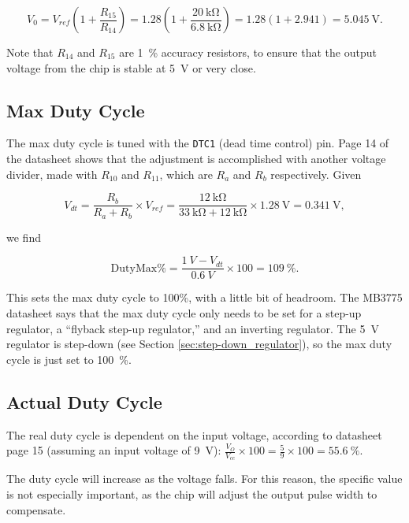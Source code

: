 \documentclass{article}
\newcommand{\chippin}{\texttt}
\newcommand{\model}{\textsf}
\begin{document}
\begin{displaymath}
  V_0 = V_{ref}(1+\frac{R_{15}}{R_{14}}) =
  1.28(1+\frac{\qty{20}{\kilo\ohm}}{\qty{6.8}{\kilo\ohm}})
  = 1.28(1+2.941) = \qty{5.045}{\volt}.
\end{displaymath}

Note that $R_{14}$ and $R_{15}$ are \qty{1}{\%} accuracy resistors, to
ensure that the output voltage from the chip is stable at
\qty{5}{\volt} or very close.


\subsection{Max Duty Cycle}
The max duty cycle is tuned with the \chippin{DTC1} (dead time
control) pin. Page 14 of the datasheet shows that the adjustment is
accomplished with another voltage divider, made with $R_{10}$ and
$R_{11}$, which are $R_a$ and $R_b$ respectively. Given

\begin{displaymath}
  V_{dt} = \frac{R_b}{R_a+R_b} \times{} V_{ref} =
  \frac{\qty{12}{\kilo\ohm}}{\qty{33}{\kilo\ohm} + \qty{12}{\kilo\ohm}} \times{}
  \qty{1.28}{\volt} = \qty{0.341}{\volt},
\end{displaymath}

\noindent
we find

\begin{displaymath}
  \mathrm{Duty Max \%} = \frac{\qty{1}{V} - V_{dt}}{\qty{0.6}{V}}
  \times{} 100 = \qty{109}{\%}.
\end{displaymath}

This sets the max duty cycle to 100\%, with a little bit of
headroom. The \model{MB3775} datasheet says that the max duty cycle
only needs to be set for a step-up regulator, a ``flyback step-up
regulator,'' and an inverting regulator. The \qty{5}{\volt} regulator
is step-down (see Section \ref{sec:step-down_regulator}), so the max
duty cycle is just set to \qty{100}{\%}.

\subsection{Actual Duty Cycle}
The real duty cycle is dependent on the input voltage, according to
datasheet page 15 (assuming an input voltage of \qty{9}{\volt}):
$\frac{V_O}{V_{cc}}\times{}100 = \frac{5}{9}\times{}100 =
\qty{55.6}{\%}$.

The duty cycle will increase as the voltage falls. For this reason,
the specific value is not especially important, as the chip will
adjust the output pulse width to compensate.
\end{document}
